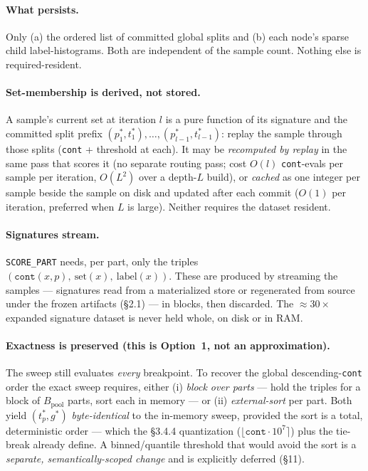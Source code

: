 \documentclass[11pt]{article}
\newcommand{\code}[1]{\texttt{#1}}
\newcommand{\cont}{\code{cont}}
\newcommand{\score}{\code{SCORE\_PART}}
\begin{document}
\paragraph{What persists.} Only (a) the ordered list of committed global splits and (b) each node's sparse child label-histograms. Both are independent of the sample count. Nothing else is required-resident.

\paragraph{Set-membership is derived, not stored.} A sample's current set at iteration $l$ is a pure function of its signature and the committed split prefix $(p^*_1,t^*_1),\dots,(p^*_{l-1},t^*_{l-1})$: replay the sample through those splits (\cont{} + threshold at each). It may be \emph{recomputed by replay} in the same pass that scores it (no separate routing pass; cost $O(l)$ \cont{}-evals per sample per iteration, $O(L^2)$ over a depth-$L$ build), or \emph{cached} as one integer per sample beside the sample on disk and updated after each commit ($O(1)$ per iteration, preferred when $L$ is large). Neither requires the dataset resident.

\paragraph{Signatures stream.} \score{} needs, per part, only the triples $(\cont(x,p),\ \text{set}(x),\ \text{label}(x))$. These are produced by streaming the samples --- signatures read from a materialized store or regenerated from source under the frozen artifacts (\S2.1) --- in blocks, then discarded. The $\approx\!30\times$ expanded signature dataset is never held whole, on disk or in RAM.

\paragraph{Exactness is preserved (this is Option~1, not an approximation).} The sweep still evaluates \emph{every} breakpoint. To recover the global descending-\cont{} order the exact sweep requires, either (i) \emph{block over parts} --- hold the triples for a block of $B_{\text{pool}}$ parts, sort each in memory --- or (ii) \emph{external-sort} per part. Both yield $(t_p^*,g^*)$ \emph{byte-identical} to the in-memory sweep, provided the sort is a total, deterministic order --- which the \S3.4.4 quantization ($\lfloor \cont\cdot10^7\rceil$) plus the tie-break already define. A binned/quantile threshold that would avoid the sort is a \emph{separate, semantically-scoped change} and is explicitly deferred (\S11).
\end{document}

